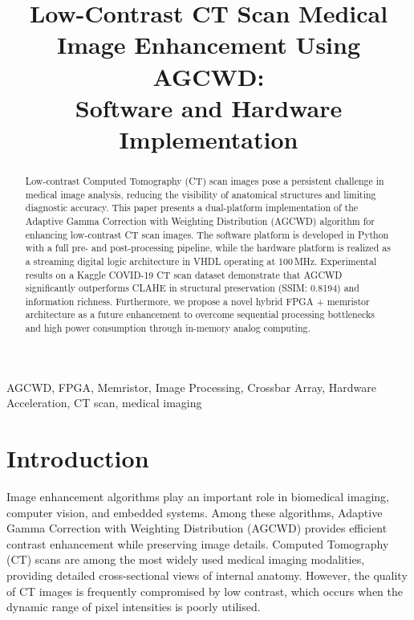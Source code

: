 \documentclass[conference]{IEEEtran}
\begin{document}
\title{Low-Contrast CT Scan Medical Image Enhancement Using AGCWD:\\
Software and Hardware Implementation}

\author{
}

\maketitle

\begin{abstract}
Low-contrast Computed Tomography (CT) scan images pose a persistent challenge in medical image analysis, reducing the visibility of anatomical structures and limiting diagnostic accuracy. This paper presents a dual-platform implementation of the Adaptive Gamma Correction with Weighting Distribution (AGCWD) algorithm for enhancing low-contrast CT scan images. The software platform is developed in Python with a full pre- and post-processing pipeline, while the hardware platform is realized as a streaming digital logic architecture in VHDL operating at 100\,MHz. Experimental results on a Kaggle COVID-19 CT scan dataset demonstrate that AGCWD significantly outperforms CLAHE in structural preservation (SSIM: 0.8194) and information richness. Furthermore, we propose a novel hybrid FPGA + memristor architecture as a future enhancement to overcome sequential processing bottlenecks and high power consumption through in-memory analog computing.
\end{abstract}

\begin{IEEEkeywords}
AGCWD, FPGA, Memristor, Image Processing, Crossbar Array, Hardware Acceleration, CT scan, medical imaging
\end{IEEEkeywords}

\section{Introduction}

Image enhancement algorithms play an important role in biomedical imaging, computer vision, and embedded systems. Among these algorithms, Adaptive Gamma Correction with Weighting Distribution (AGCWD) provides efficient contrast enhancement while preserving image details. Computed Tomography (CT) scans are among the most widely used medical imaging modalities, providing detailed cross-sectional views of internal anatomy. However, the quality of CT images is frequently compromised by low contrast, which occurs when the dynamic range of pixel intensities is poorly utilised.
\end{document}
